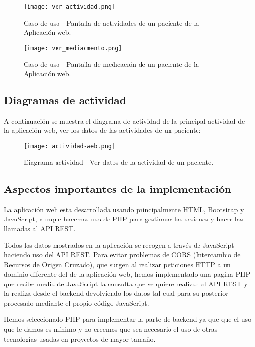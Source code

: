 \documentclass[11pt,spanish]{article}
\begin{document}
\begin{figure}[H]
  \centering
  \texttt{[image: ver\_actividad.png]}
  \caption{Caso de uso - Pantalla de actividades de un paciente de la Aplicación web.}
\end{figure}

\begin{figure}[H]
  \centering
  \texttt{[image: ver\_mediacmento.png]}
  \caption{Caso de uso - Pantalla de medicación de un paciente de la Aplicación web.}
\end{figure}


\subsection{Diagramas de actividad}
A continuación se muestra el diagrama de actividad de la principal actividad de la aplicación web, ver los datos de las actividades de un paciente:

\begin{figure}[H]
  \centering
  \texttt{[image: actividad-web.png]}
  \caption{Diagrama actividad - Ver datos de la actividad de un paciente.}
\end{figure}

\subsection{Aspectos importantes de la implementación}

La aplicación web esta desarrollada usando principalmente HTML, Bootstrap y JavaScript, aunque hacemos uso de PHP para gestionar las sesiones y hacer las llamadas al API REST.
\newline

Todos los datos mostrados en la aplicación se recogen a través de JavaScript haciendo uso del API REST. Para evitar problemas de CORS (Intercambio de Recursos de Origen Cruzado), que surgen al realizar peticiones HTTP a un dominio diferente del de la aplicación web, hemos implementado una pagina PHP que recibe mediante JavaScript la consulta que se quiere realizar al API REST y la realiza desde el backend devolviendo los datos tal cual para su posterior procesado mediante el propio código JavaScript.
\newline

Hemos seleccionado PHP para implementar la parte de backend ya que que el uso que le damos es mínimo y no creemos que sea necesario el uso de otras tecnologías usadas en proyectos de mayor tamaño.
\newline
\end{document}
